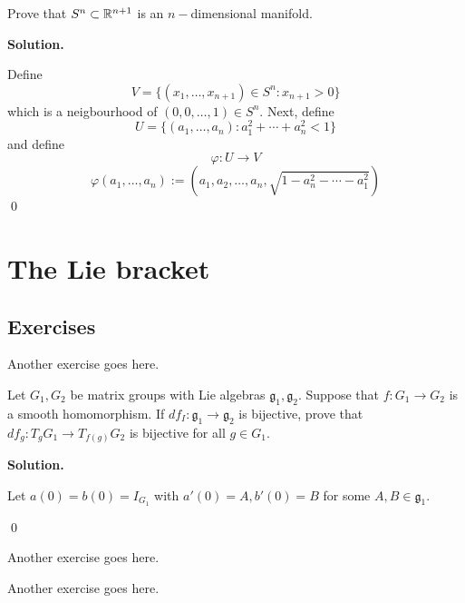 \documentclass[12pt]{book}
\theoremstyle{definition}
\newenvironment{solution}
{%
  \par\noindent\textbf{Solution.}\quad
}
{%
  \qed\par
}
\begin{document}
\begin{taggedexercise}[\textcolor{yellow}{WIP}]
  Prove that $S^n \subset \mathbb{R}^{n+1}$ is an $n-$dimensional manifold.
\end{taggedexercise}
\begin{solution}
  Define 
  \[V = \{(x_1, \dots, x_{n+1}) \in S^n : x_{n+1} >0\}\]
  which is a neigbourhood of $(0, 0, \dots, 1) \in S^n$.
  Next, define
  \[U = \{(a_1, \dots, a_n) : a_1^2 + \cdots + a_n^2 < 1\}\]
  and define
  \[\varphi : U \to V\]
  \[\varphi(a_1, \dots, a_n) := (a_1, a_2, \dots , a_n, \sqrt{1 - a_n^2 - \cdots - a_1^2})\]
\end{solution}

\chapter{The Lie bracket}
\section{Exercises}

\begin{taggedexercise}[\textcolor{red}{TODO}]
Another exercise goes here.
\end{taggedexercise}

\begin{taggedexercise}[\textcolor{red}{TODO}]
  Let $G_1, G_2$ be matrix groups with Lie algebras $\mathfrak{g}_1, \mathfrak{g_2}$.
  Suppose that $f: G_1 \to G_2$ is a smooth homomorphism.
  If $df_I : \mathfrak{g}_1 \to \mathfrak{g}_2$ is bijective, prove that $df_g : T_gG_1 \to T_{f(g)}G_2$ is bijective for all $g \in G_1$.
\end{taggedexercise}

\begin{solution}
  Let $a(0) = b(0) = I_{G_1}$ with $a'(0) = A, b'(0) = B$ for some $A, B \in \mathfrak{g_1}$.

\end{solution}

\begin{taggedexercise}[\textcolor{red}{TODO}]
  Another exercise goes here.
\end{taggedexercise}

\begin{taggedexercise}[\textcolor{red}{TODO}]
  Another exercise goes here.
\end{taggedexercise}
\end{document}
